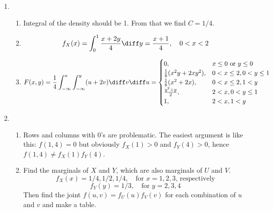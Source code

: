 \documentclass[12pt]{article}
\begin{document}
\begin{enumerate}
\item
\begin{enumerate}
\item Integral of the density should be 1. From that we find $C = 1/4$.
\item
\[
f_X(x)
= \int_0^1 \frac{x+2y}{4} \diff y
= \frac{x+1}{4},
\quad 0<x<2
\]
\item
\[
F(x,y)
= \frac{1}{4} \int_{-\infty}^x \int_{-\infty}^y (u + 2v) \diff v \diff u
= \begin{cases}
    0, & x \le 0 \text{ or } y \le 0\\
    \frac{1}{8}(x^2 y + 2xy^2), & 0<x\le 2, 0<y\le 1\\
    \frac{1}{8}(x^2 + 2x), & 0<x\le 2, 1<y\\
    \frac{y^2 + y}{2}, & 2<x, 0<y\le 1\\
    1, & 2<x, 1<y
    \end{cases}
\]
\end{enumerate}

\item
\begin{enumerate}
\item Rows and columns with 0's are problematic.
The easiest argument is like this:
$f(1, 4) = 0$ but obviously $f_X(1) > 0$ and $f_Y(4) > 0$,
hence $f(1,4) \ne f_X(1) f_Y(4)$.

\item Find the marginals of $X$ and $Y$, which are also marginals of $U$
and $V$.
\[
f_X(x) = 1/4, 1/2, 1/4, \quad \text{for $x=1,2,3$, respectively}
\]
\[
f_Y(y) = 1/3, \quad \text{for $y=2,3,4$}
\]
Then find the joint $f(u,v) = f_U(u) f_V(v)$ for each combination of $u$
and $v$ and make a table.
\end{enumerate}
\end{enumerate}
\end{document}

